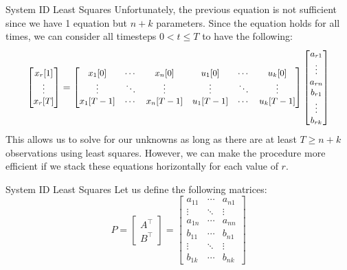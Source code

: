 \begin{frame}{System ID Least Squares}
	Unfortunately, the previous equation is not sufficient since we have 1 equation but $n+k$ parameters. Since the equation holds for all times, we can consider all timesteps $0<t\leq T$ to have the following:
	\[
		\small
		\begin{bmatrix}
			x_r[1] \\
			\vdots \\
			x_r[T] \\
		\end{bmatrix}
		=
		\begin{bmatrix}
			x_1[0] & \cdots & x_n[0] & u_1[0] & \cdots & u_k[0] \\
			\vdots & \ddots & \vdots & \vdots & \ddots & \vdots \\
			x_1[T-1] & \cdots & x_n[T-1] & u_1[T-1] & \cdots & u_k[T-1] \\
		\end{bmatrix}
		\begin{bmatrix}
			a_{r1} \\ 
			\vdots \\
			a_{rn} \\
			b_{r1} \\ 
			\vdots \\
			b_{rk} 
		\end{bmatrix}
	\]
	This allows us to solve for our unknowns as long as there are at least $T\geq n+k$ observations using least squares. However, we can make the procedure more efficient if we stack these equations horizontally for each value of $r$.
\end{frame}

\begin{frame}{System ID Least Squares}
	Let us define the following matrices:
	\[
		P 
		= 
		\begin{bmatrix}
			A^\top \\ 
			B^\top
		\end{bmatrix}
		=
		\begin{bmatrix}
			a_{11} & \cdots & a_{n1} \\
			\vdots & \ddots & \vdots \\
			a_{1n} & \cdots & a_{nn} \\
			b_{11} & \cdots & b_{n1} \\
			\vdots & \ddots & \vdots \\
			b_{1k} & \cdots & b_{nk}     
		\end{bmatrix}  
	\]
\end{frame}

